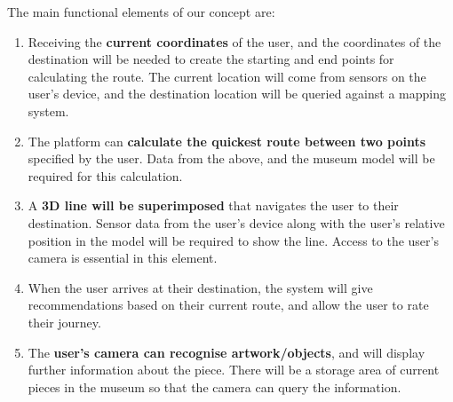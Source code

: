 
The main functional elements of our concept are:

\begin{enumerate}
	\item Receiving the \textbf{current coordinates} of the user, and the coordinates of the destination will be needed to create the starting and end points for calculating the route. The current location will come from sensors on the user's device, and the destination location will be queried against a mapping system.
	\item The platform can \textbf{calculate the quickest route between two points} specified by the user. Data from the above, and the museum model will be required for this calculation.
	\item A \textbf{3D line will be superimposed} that navigates the user to their destination. Sensor data from the user's device along with the user's relative position in the model will be required to show the line. Access to the user's camera is essential in this element.
	\item When the user arrives at their destination, the system will give recommendations based on their current route, and allow the user to rate their journey.
	\item The \textbf{user's camera can recognise artwork/objects}, and will display further information about the piece. There will be a storage area of current pieces in the museum so that the camera can query the information.
\end{enumerate}
